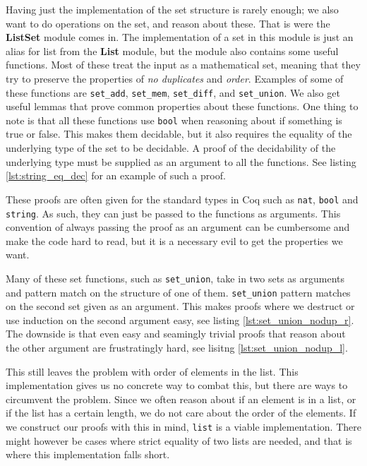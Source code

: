 Having just the implementation of the set structure is rarely enough; we also want to do operations on the set, and reason about these.
That is were the \textbf{ListSet} module comes in.
The implementation of a set in this module is just an alias for list from the \textbf{List} module,
but the module also contains some useful functions. Most of these treat the input as a mathematical set,
meaning that they try to preserve the properties of \textit{no duplicates} and \textit{order}.
Examples of some of these functions are \texttt{set_add}, \texttt{set_mem}, \texttt{set_diff},
and \texttt{set_union}.
We also get useful lemmas that prove common properties about these functions.
One thing to note is that all these functions use \texttt{bool} when reasoning about if something is true or false.
This makes them decidable, but it also requires the equality of the underlying type of the set to be decidable.
A proof of the decidability of the underlying type must be supplied as an argument to all the functions.
See listing \ref{lst:string_eq_dec} for an example of such a proof.

These proofs are often given for the standard types in Coq such as \texttt{nat}, \texttt{bool} and \texttt{string}.
As such, they can just be passed to the functions as arguments.
This convention of always passing the proof as an argument can be cumbersome and make the code hard to read,
but it is a necessary evil to get the properties we want.

Many of these set functions, such as \texttt{set_union}, take in two sets as arguments and pattern match on the structure of one of them.
\texttt{set_union} pattern matches on the second set given as an argument.
This makes proofs where we destruct or use induction on the second argument easy, see listing \ref{lst:set_union_nodup_r}.
The downside is that even easy and seamingly trivial proofs that reason about the other argument are frustratingly hard,
see lisitng \ref{lst:set_union_nodup_l}.

This still leaves the problem with order of elements in the list. This implementation gives us no concrete way to combat this,
but there are ways to circumvent the problem. Since we often reason about if an element is in a list, or if the list has
a certain length, we do not care about the order of the elements. If we construct our proofs with this in mind, \texttt{list} is a viable
implementation. There might however be cases where strict equality of two lists are needed, and that is where this implementation falls short.

